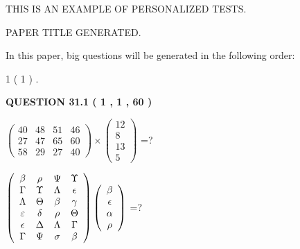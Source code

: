 \documentclass[12pt]{article}
\begin{document}
   
   
   
   
   
 \vspace{0.2in}
{\Huge  THIS IS AN EXAMPLE OF}
{\Huge  PERSONALIZED TESTS. }
   
   
 PAPER TITLE GENERATED.
   
   
   
\vspace{0.2in}
   
In this paper, big questions will be generated in the following order: 
   
   
   1 ( 1 )
 .
  
\vspace{0.2in}
  
{\textbf{\Large{QUESTION
31.1 
 ( 1 , 1 , 60 )
}}}
  
  
 
$ \left( \begin{array}{ccccccccc}
 40  & 
 48  & 
 51  & 
 46  \\ 
 27  & 
 47  & 
 65  & 
 60  \\ 
 58  & 
 29  & 
 27  & 
 40
\end{array}\right) \times
\left( \begin{array}{c}
 12  \\ 
 8  \\ 
 13  \\ 
 5
\end{array}\right) $ =?
 
 
$  %
 \left( \begin{array}
 {
 c
 c
 c
 c
 }
 \beta & 
 \rho & 
 \Psi & 
 \Upsilon \\ 
 \Gamma & 
 \Upsilon & 
 \Lambda & 
 \epsilon \\ 
 \Lambda & 
 \Theta & 
 \beta & 
 \gamma \\ 
 \varepsilon & 
 \delta & 
 \rho & 
 \Theta \\ 
 \epsilon & 
 \Delta & 
 \Lambda & 
 \Gamma \\ 
 \Gamma & 
 \Psi & 
 \sigma & 
 \beta
 \end{array} \right)
 \left( \begin{array}
 {
 c
 }
 \beta \\ 
 \epsilon \\ 
 \alpha \\ 
 \rho
 \end{array} \right)
$ =?
 
 
 
\noindent{}
 
\end{document}
